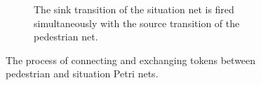 \documentclass[11pt, a4paper]{book}
\begin{document}
\begin{figure}
\begin{subfigure}[b]{0.4\textwidth}
\caption{The sink transition of the situation net is fired simultaneously with the source transition of the pedestrian net.}
\end{subfigure}
\caption{The process of connecting and exchanging tokens between pedestrian and situation Petri nets.}
\label{fig:petrinetconnect}
\end{figure}











\end{document}
